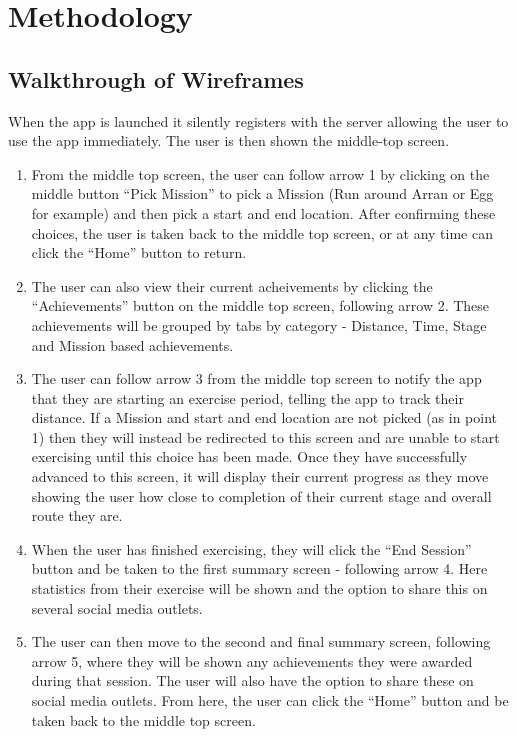 \chapter{Methodology}\label{ch_method}

\section{Walkthrough of Wireframes}
When the app is launched it silently registers with the server
allowing the user to use the app immediately. The user is then shown
the middle-top screen.
\begin{enumerate}
  \item From the middle top screen, the user can follow arrow 1 by
    clicking on the middle button ``Pick Mission'' to pick a Mission
    (Run around Arran or Egg for example) and then pick a start and
    end location. After confirming these choices, the user is taken
    back to the middle top screen, or at any time can click the
    ``Home'' button to return. 
  \item The user can also view their current acheivements by clicking
    the ``Achievements'' button on the middle top screen, following
    arrow 2. These achievements will be grouped by tabs by category -
    Distance, Time, Stage and Mission based achievements.
  \item The user can follow arrow 3 from the middle top screen to
    notify the app that they are starting an exercise period, telling
    the app to track their distance. If a Mission and start and end
    location are not picked (as in point 1) then they will instead be
    redirected to this screen and are unable to start exercising until
    this choice has been made. Once they have successfully advanced to
    this screen, it will display their current progress as they move
    showing the user how close to completion of their current stage
    and overall route they are. 
  \item When the user has finished exercising, they will click the
    ``End Session'' button and be taken to the first summary screen -
    following arrow 4. Here statistics from their exercise will be
    shown and the option to share this on several social media
    outlets.
  \item The user can then move to the second and final summary screen,
    following arrow 5, where they will be shown any achievements they
    were awarded during that session. The user will also have the
    option to share these on social media outlets. From here, the user
    can click the ``Home'' button and be taken back to the middle top
    screen. 
\end{enumerate}
